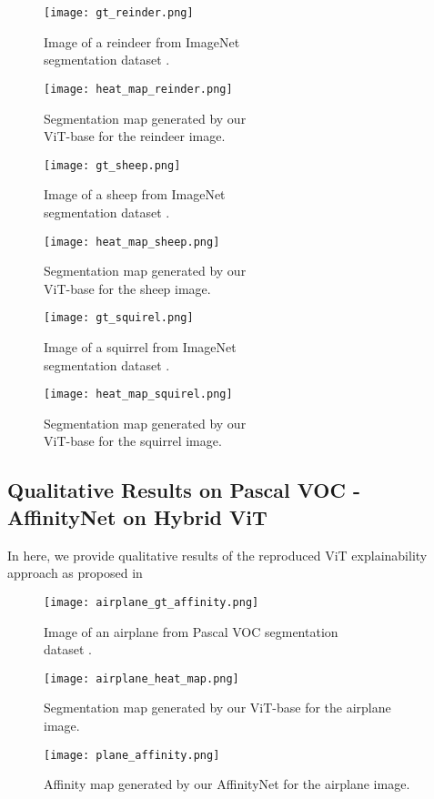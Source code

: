 \documentclass{article}
\begin{document}
\begin{figure}[H]
  \texttt{[image: gt\_reinder.png]}
  \caption{Image of a reindeer from ImageNet \\segmentation dataset \cite{imagenet-seg}.}\label{fig:gt_reinder}
\endminipage\hfill
{}
  \texttt{[image: heat\_map\_reinder.png]}
  \caption{Segmentation map generated by our \\ViT-base for the reindeer image.}\label{fig:map_reinder}
\endminipage\hfill
\end{figure}

\begin{figure}[H]
  \texttt{[image: gt\_sheep.png]}
  \caption{Image of a sheep from ImageNet \\segmentation dataset \cite{imagenet-seg}.}\label{fig:gt_sheep}
\endminipage\hfill
{}
  \texttt{[image: heat\_map\_sheep.png]}
  \caption{Segmentation map generated by our \\ViT-base for the sheep image.}\label{fig:map_sheep}
\endminipage\hfill
\end{figure}

\begin{figure}[H]
  \texttt{[image: gt\_squirel.png]}
  \caption{Image of a squirrel from ImageNet \\segmentation dataset \cite{imagenet-seg}.}\label{fig:gt_squirel}
\endminipage\hfill
{}
  \texttt{[image: heat\_map\_squirel.png]}
  \caption{Segmentation map generated by our \\ViT-base for the squirrel image.}\label{fig:map_squirel}
\endminipage\hfill
\end{figure}

\subsection*{Qualitative Results on Pascal VOC - AffinityNet on Hybrid ViT}
\label{Pascal_results}
In here, we provide qualitative results of the reproduced ViT explainability approach as proposed in \cite{mainpaper}


\begin{figure}[H]
  \texttt{[image: airplane\_gt\_affinity.png]}
  \caption{Image of an airplane from Pascal VOC segmentation \\dataset \cite{ahn2018learning}.}
  \label{fig:plane_gt}
\endminipage\hfill
{}
  \texttt{[image: airplane\_heat\_map.png]}
  \caption{Segmentation map generated by our ViT-base for the airplane image.}
  \label{fig:phane_map}
\endminipage\hfill
{}%
  \texttt{[image: plane\_affinity.png]}
  \caption{Affinity map generated by our AffinityNet for the airplane image.}
  \label{fig:plane_aff}
\endminipage
\end{figure}
\end{document}
